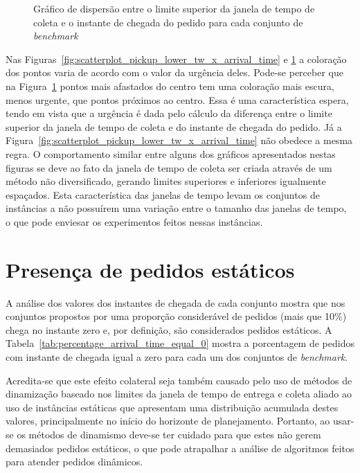 \begin{figure}[h]
    \centering
    \caption{Gráfico de dispersão entre o limite superior da janela de tempo 
             de coleta e o instante de chegada do pedido para cada conjunto 
             de \textit{benchmark}}
    \label{fig:scatterplot_pickup_upper_tw_x_arrival_time}
\end{figure}

Nas Figuras~\ref{fig:scatterplot_pickup_lower_tw_x_arrival_time} 
e \ref{fig:scatterplot_pickup_upper_tw_x_arrival_time} a coloração dos
pontos varia de acordo com o valor da urgência deles.
Pode-se perceber que na 
Figura~\ref{fig:scatterplot_pickup_upper_tw_x_arrival_time} 
pontos mais afastados do centro tem uma coloração mais
escura, menos urgente, que pontos próximos ao centro.
Essa é uma característica espera, tendo em vista que a urgência é dada pelo
cálculo da diferença entre o limite superior da janela de tempo de coleta e do
instante de chegada do pedido.
Já a Figura~\ref{fig:scatterplot_pickup_lower_tw_x_arrival_time} não obedece a
mesma regra.
O comportamento similar entre alguns dos gráficos apresentados nestas figuras
se deve ao fato da janela de tempo de coleta ser criada através de um método
não diversificado, gerando limites superiores e inferiores igualmente
espaçados.
Esta característica das janelas de tempo levam os conjuntos de instâncias a não
possuírem uma variação entre o tamanho das janelas de tempo, o que pode
enviesar os experimentos feitos nessas instâncias.




\section{Presença de pedidos estáticos}

A análise dos valores dos instantes de chegada de cada conjunto mostra que 
nos conjuntos propostos por  uma proporção considerável 
de pedidos (mais que 10\%) chega no instante zero e, por definição, 
são considerados pedidos estáticos.
A Tabela~\ref{tab:percentage_arrival_time_equal_0} mostra a porcentagem de 
pedidos com instante de chegada igual a zero para cada um dos conjuntos de
\textit{benchmark}.

Acredita-se que este efeito colateral seja também causado pelo uso de métodos de
dinamização baseado nos limites da janela de tempo de entrega e coleta aliado ao
uso de instâncias estáticas que apresentam uma distribuição acumulada destes 
valores, principalmente no início do horizonte de planejamento.
Portanto, ao usar-se os métodos de dinamismo deve-se ter cuidado para que estes
não gerem demasiados pedidos estáticos, o que pode atrapalhar a análise de
algoritmos feitos para atender pedidos dinâmicos.

